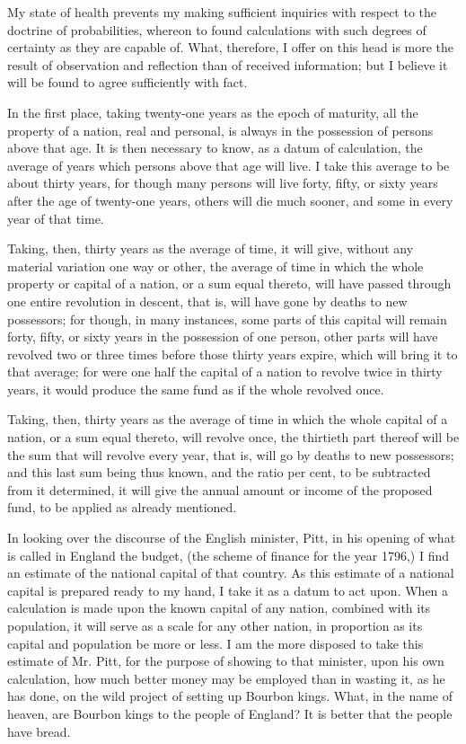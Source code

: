 My state of health prevents my making sufficient inquiries with respect to the doctrine of probabilities, whereon to found calculations with such degrees of certainty as they are capable of. What, therefore, I offer on this head is more the result of observation and reflection than of received information; but I believe it will be found to agree sufficiently with fact.\par

In the first place, taking twenty-one years as the epoch of maturity, all the property of a nation, real and personal, is always in the possession of persons above that age. It is then necessary to know, as a datum of calculation, the average of years which persons above that age will live. I take this average to be about thirty years, for though many persons will live forty, fifty, or sixty years after the age of twenty-one years, others will die much sooner, and some in every year of that time.\par

Taking, then, thirty years as the average of time, it will give, without any material variation one way or other, the average of time in which the whole property or capital of a nation, or a sum equal thereto, will have passed through one entire revolution in descent, that is, will have gone by deaths to new possessors; for though, in many instances, some parts of this capital will remain forty, fifty, or sixty years in the possession of one person, other parts will have revolved two or three times before those thirty years expire, which will bring it to that average; for were one half the capital of a nation to revolve twice in thirty years, it would produce the same fund as if the whole revolved once.\par

Taking, then, thirty years as the average of time in which the whole capital of a nation, or a sum equal thereto, will revolve once, the thirtieth part thereof will be the sum that will revolve every year, that is, will go by deaths to new possessors; and this last sum being thus known, and the ratio per cent, to be subtracted from it determined, it will give the annual amount or income of the proposed fund, to be applied as already mentioned.\par

In looking over the discourse of the English minister, Pitt, in his opening of what is called in England the budget, (the scheme of finance for the year 1796,) I find an estimate of the national capital of that country. As this estimate of a national capital is prepared ready to my hand, I take it as a datum to act upon. When a calculation is made upon the known capital of any nation, combined with its population, it will serve as a scale for any other nation, in proportion as its capital and population be more or less. I am the more disposed to take this estimate of Mr. Pitt, for the purpose of showing to that minister, upon his own calculation, how much better money may be employed than in wasting it, as he has done, on the wild project of setting up Bourbon kings. What, in the name of heaven, are Bourbon kings to the people of England? It is better that the people have bread.\par


